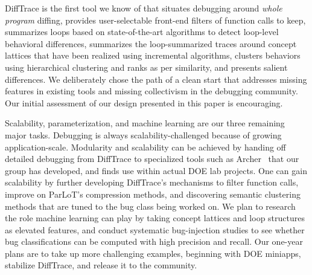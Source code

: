 DiffTrace is the first tool we know of that situates debugging around {\em whole program}
diffing, provides user-selectable front-end filters of function calls to keep,
summarizes loops based on state-of-the-art algorithms to detect loop-level
behavioral differences,
summarizes the loop-summarized
traces around concept lattices that have been realized using incremental
algorithms, clusters behaviors using hierarchical clustering and ranks as per similarity,
and presents salient differences.
%
We deliberately chose the path of a clean start that addresses missing features
in existing tools and missing collectivism in the debugging community.
%
Our initial assessment of our design presented in this paper is encouraging.


Scalability, parameterization, and machine learning are our three remaining major tasks.
%
Debugging is always scalability-challenged because of growing application-scale.
%
Modularity and scalability can be achieved by handing off detailed debugging from
DiffTrace to specialized tools such as Archer~\cite{archer} that
our group has developed, and finds use within actual DOE lab projects.
%
One can gain scalability by further developing DiffTrace's mechanisms to filter function
calls, improve on ParLoT's compression methods, and discovering semantic clustering
methods that are tuned to the bug class being worked on.
%
We plan to research the role machine learning can play by taking concept lattices
and loop structures as elevated features, and conduct systematic bug-injection
studies to see whether bug classifications can be computed with high precision
and recall.
%
Our one-year plans are to take up more challenging examples, beginning with DOE miniapps,
stabilize DiffTrace, and release it to the community.


 
